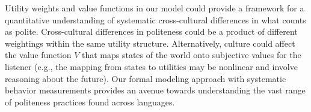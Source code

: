 \documentclass[9pt,twocolumn,twoside,lineno]{main_class_file}
\begin{document}
%



%
%

Utility weights and value functions in our model could provide a framework for a quantitative understanding of systematic
cross-cultural differences in what counts as polite. Cross-cultural differences in politeness could be a product of different weightings within the same
utility structure. Alternatively, culture could affect
the value function \(V\) that maps states of the world onto subjective
values for the listener (e.g., the mapping from states to utilities may
be nonlinear and involve reasoning about the future).
Our formal modeling approach with systematic behavior measurements provides an avenue towards understanding the vast range of politeness practices found across languages.
\end{document}
